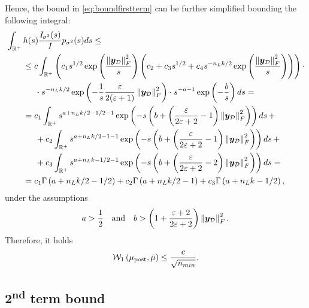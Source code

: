 Hence, the bound in \cref{eq:boundfirstterm} can be further simplified bounding the following integral:
\begin{align*}
	& \int_{\real^+} h(s) \frac{\mathit{I}_{\sigma^2}(s)}{\mathit{I}} p_{\sigma^2}(s) ds \leq \\
	& \kern20pt \begin{aligned}
		& \leq c \int_{\real^+} \left(c_1 s^{1/2} \exp{\frac{\norm{\bm{y}_{\mathcal{D}}}_F^2}{s}} \left(c_2 + c_3 s^{1/2} + c_4 s^{- n_L k / 2} \exp{\frac{\norm{\bm{y}_{\mathcal{D}}}_F^2}{s}}\right)\right) \cdot \\
		& \blankeq \cdot s^{- n_L k / 2} \exp{-\frac{1}{s} \frac{\epsilon}{2 (\epsilon + 1)} \norm{\bm{y}_{\mathcal{D}}}_F^2 } \cdot s^{- a - 1} \exp{-\frac{b}{s}} ds = \\
		& = c_1 \int_{\real^+} s^{a + n_L k / 2 - 1/2 - 1} \exp{-s \left(b + \left(\frac{\epsilon}{2\epsilon + 2} - 1\right) \norm{\bm{y}_{\mathcal{D}}}_F^2\right)} ds \, + \\
		& \blankeq + c_2 \int_{\real^+} s^{a + n_L k / 2 - 1 - 1} \exp{-s \left(b + \left(\frac{\epsilon}{2\epsilon + 2} - 1\right) \norm{\bm{y}_{\mathcal{D}}}_F^2\right)} ds \, + \\
		& \blankeq + c_3 \int_{\real^+} s^{a + n_L k - 1/2 - 1} \exp{-s \left(b + \left(\frac{\epsilon}{2\epsilon + 2} - 2\right) \norm{\bm{y}_{\mathcal{D}}}_F^2\right)} ds = \\
		& = c_1 \Gamma\left(a + n_L k / 2 - 1/2\right) + c_2 \Gamma\left(a + n_L k / 2 - 1\right) + c_3 \Gamma\left(a + n_L k - 1/2\right),
	\end{aligned}
\end{align*}
under the assumptions 
\begin{equation*}
	a > \frac{1}{2} \quad \text{and} \quad b > \left(1 + \frac{\epsilon + 2}{2\epsilon + 2}\right) \norm{\bm{y}_{\mathcal{D}}}_F^2.
\end{equation*}
Therefore, it holds
\begin{equation*}
	\wass[1]{\mu_{\mathrm{post}}}{\bar{\mu}} \leq \frac{c}{\sqrt{n_{min}}}.
\end{equation*}

\subsection{\texorpdfstring{2\textsuperscript{nd}}{Second} term bound} \label{subsec:secondterm}

